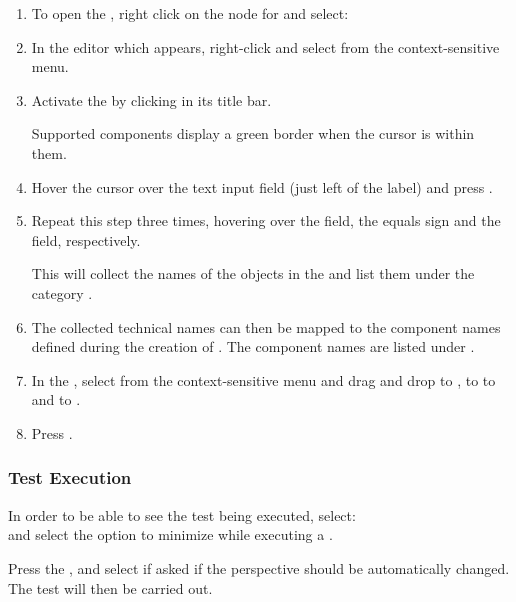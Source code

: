 \begin{enumerate}
\item To open the \gdomeditor{}, right click on the node for 
and select:\\
\item In the editor which appears, 
right-click and select   from the 
context-sensitive menu. 
\item Activate the 
\gdaut{} by clicking in its title bar. 

Supported components display a green border when the cursor
is within them.
\item Hover the cursor over the  text input field 
(just left of the  label) and press
. 
\item Repeat this step three times, hovering over the 
 field, the equals sign and the  field,
respectively. 

This will collect the names of the objects in the \gdaut{} and
list them under the category .
\item The collected technical 
names can then be mapped to the component names defined
during the creation of \gdsteps{}. The component names are listed under 
.  
\item In
 the \gdomeditor{}, select   from
 the context-sensitive menu
 and drag and drop  to , 
 to  
 to  and  to
 . 
 \item Press . 
\end{enumerate}

\subsubsection{Test Execution}
In order to be able to see the test being executed, select: \\ 
 and select the option to minimize \jb{} while executing a \gdsuite{}.

Press the , and select 
if asked if the perspective should be automatically changed. 
The test will then be carried out.

